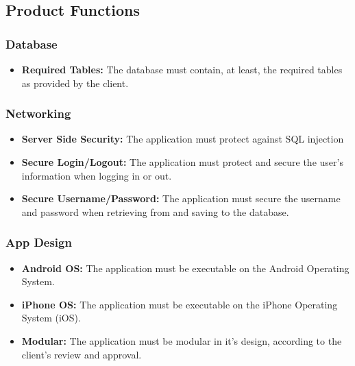 \documentclass[letterpaper, 10, draftclsnofoot, onecolumn]{IEEEtran}
\begin{document}
\subsection{Product Functions}

\subsubsection{Database}
\begin{itemize} 

\item \textbf{Required Tables: } The database must contain, at least, the required tables as provided by the client. 
\end{itemize}
\subsubsection{Networking}
\begin{itemize} 

\item \textbf{Server Side Security: } The application must protect against SQL injection
\item \textbf{Secure Login/Logout: } The application must protect and secure the user's information when logging in or out.
\item \textbf{Secure Username/Password:} The application must secure the username and password when retrieving from and saving to the database.

\end{itemize}
\subsubsection{App Design}
\begin{itemize} 

\item \textbf{Android OS:} The application must be executable on the Android Operating System.
\item \textbf{iPhone OS:} The application must be executable on the iPhone Operating System (iOS).
\item \textbf{Modular: } The application must be modular in it's design, according to the client's review and approval. 

\end{itemize}
\end{document}
